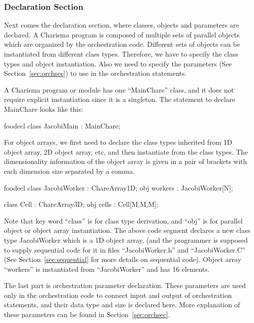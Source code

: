 \subsubsection{Declaration Section}

Next comes the declaration section, where classes, objects and parameters are
declared. A Charisma program is composed of multiple sets of parallel objects
which are organized by the orchestration code. Different sets of objects can be
instantiated from different class types. Therefore, we have to specify the class
types and object instantiation. Also we need to specify the parameters (See
Section~\ref{sec:orchsec}) to use in the orchestration statements. 

A Charisma program or module has one ``MainChare'' class, and it does not
require explicit instantiation since it is a singleton. The statement to declare
MainChare looks like this:

\begin{SaveVerbatim}{foodecl}
    class JacobiMain : MainChare;
\end{SaveVerbatim}

For object arrays, we first need to declare the class types inherited from 1D
object array, 2D object array, etc, and then instantiate from the class types. 
The dimensionality information of the object array is given in a pair of 
brackets with each dimension size separated by a comma.

\begin{SaveVerbatim}{foodecl}
    class JacobiWorker : ChareArray1D;
    obj workers : JacobiWorker[N];

    class Cell : ChareArray3D;
    obj cells : Cell[M,M,M];
\end{SaveVerbatim}

Note that key word ``class'' is for class type derivation, and ``obj'' is for
parallel object or object array instantiation. The above code segment declares a
new class type JacobiWorker which is a 1D object array, (and the programmer is
supposed to supply sequential code for it in files ``JacobiWorker.h'' and
``JacobiWorker.C'' (See Section~\ref{sec:sequential} for more details on
sequential code). Object array ``workers'' is instantiated from ``JacobiWorker''
and has 16 elements.

The last part is orchestration parameter declaration. These parameters are used
only in the orchestration code to connect input and output of orchestration
statements, and their data type and size is declared here. More explanation of
these parameters can be found in Section~\ref{sec:orchsec}. 

